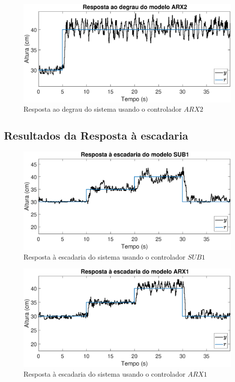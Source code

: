 \begin{figure}[H]
	\centering
	\includegraphics[width=1\linewidth]{steprealarx2}
	\caption[Resposta ao degrau do sistema controlado $AR21$]{Resposta ao degrau do sistema usando o controlador $ARX2$}
	\label{fig:steprealarx2}
\end{figure}

\subsection{Resultados da Resposta à escadaria}\label{rstair}

\begin{figure}[H]
	\centering
	\includegraphics[width=1\linewidth]{stairrealsub1}
	\caption[Resposta à escadaria do sistema controlado $SUB1$]{Resposta à escadaria do sistema usando o controlador $SUB1$}
	\label{fig:stairrealsub1}
\end{figure}

\begin{figure}[H]
	\centering
	\includegraphics[width=1\linewidth]{stairrealarx1}
	\caption[Resposta à escadaria do sistema controlado $ARX1$]{Resposta à escadaria do sistema usando o controlador $ARX1$}
	\label{fig:stairrealarx1}
\end{figure}

